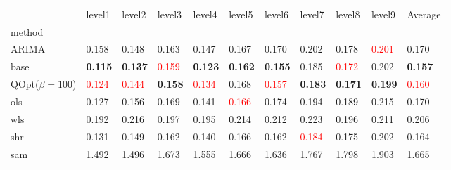 \begin{tabular}{lllllllllll}
\toprule
 & level1 & level2 & level3 & level4 & level5 & level6 & level7 & level8 & level9 & Average \\
method &  &  &  &  &  &  &  &  &  &  \\
\midrule
ARIMA & 0.158 & 0.148 & 0.163 & 0.147 & 0.167 & 0.170 & 0.202 & 0.178 & \textcolor{red}{0.201} & 0.170 \\
base & \textbf{0.115} & \textbf{0.137} & \textcolor{red}{0.159} & \textbf{0.123} & \textbf{0.162} & \textbf{0.155} & 0.185 & \textcolor{red}{0.172} & 0.202 & \textbf{0.157} \\
\midrule
QOpt($\beta=100$) & \textcolor{red}{0.124} & \textcolor{red}{0.144} & \textbf{0.158} & \textcolor{red}{0.134} & 0.168 & \textcolor{red}{0.157} & \textbf{0.183} & \textbf{0.171} & \textbf{0.199} & \textcolor{red}{0.160} \\
ols & 0.127 & 0.156 & 0.169 & 0.141 & \textcolor{red}{0.166} & 0.174 & 0.194 & 0.189 & 0.215 & 0.170 \\
wls & 0.192 & 0.216 & 0.197 & 0.195 & 0.214 & 0.212 & 0.223 & 0.196 & 0.211 & 0.206 \\
shr & 0.131 & 0.149 & 0.162 & 0.140 & 0.166 & 0.162 & \textcolor{red}{0.184} & 0.175 & 0.202 & 0.164 \\
sam & 1.492 & 1.496 & 1.673 & 1.555 & 1.666 & 1.636 & 1.767 & 1.798 & 1.903 & 1.665 \\
\bottomrule
\end{tabular}